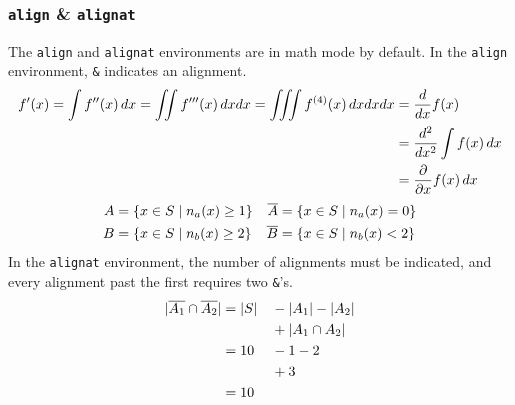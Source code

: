 \documentclass{article} 		%
\begin{document}
\subsubsection{\texttt{align} \& \texttt{alignat}
} \label{subsubsec:align}
The \texttt{align} and \texttt{alignat} environments are in math mode by default. 
In the \texttt{align} environment, \texttt{\&} indicates an alignment.
\begin{align*}
	f'(x) = \int f''(x)\dx %
	= \iint f'''(x)\dx dx 
	= \iiint f^{(4)}(x)\dx dxdx
	&= \f{d}{dx} f(x) \\
	&= \f{d^2}{dx^2} \int f(x)\dx \\
	&= \f{\del}{\del x} f(x)\dx
\end{align*}
\begin{align*}
	A &= \{x \in S \mid n_a(x) \ge 1\} &\overline{A} &= \{x \in S \mid n_a(x) = 0\} \\
	B &= \{x \in S \mid n_b(x) \ge 2\} &\overline{B} &= \{x \in S \mid n_b(x) < 2\}
\end{align*}
In the \texttt{alignat} environment, the number of alignments must be indicated, and every alignment past the first requires two \texttt{\&}'s. 
\begin{alignat*}{2}
	|\overline{A_1} \cap \overline{A_2}| 
	&= |S| &&- |A_1| - |A_2| \\
	& 	   &&+ |A_1 \cap A_2| \\
	&= 10  &&- 1 - 2 \\
	& 	   &&+ 3 \\
	&= 10
\end{alignat*}
\end{document}
